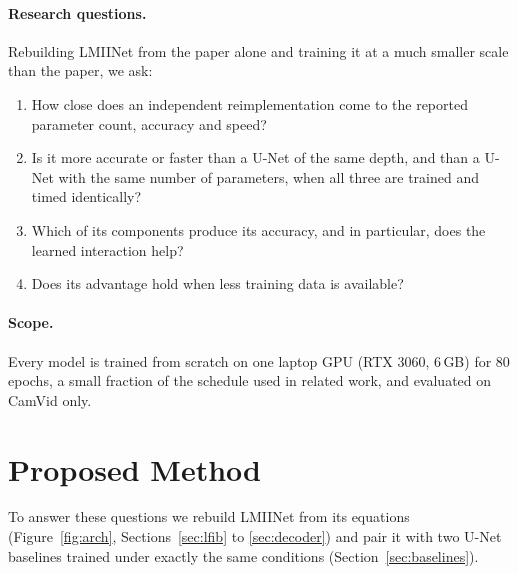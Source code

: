 \documentclass{article}
\begin{document}
\paragraph{Research questions.} Rebuilding LMIINet from the paper alone and training it at a much
smaller scale than the paper, we ask:
\begin{enumerate}
  \item[RQ1] How close does an independent reimplementation come to the reported parameter count,
             accuracy and speed?
  \item[RQ2] Is it more accurate or faster than a U-Net of the same depth, and than a U-Net with the
             same number of parameters, when all three are trained and timed identically?
  \item[RQ3] Which of its components produce its accuracy, and in particular, does the learned
             interaction help?
  \item[RQ4] Does its advantage hold when less training data is available?
\end{enumerate}

\paragraph{Scope.} Every model is trained from scratch on one laptop GPU (RTX 3060, 6\,GB) for 80
epochs, a small fraction of the schedule used in related work, and evaluated on CamVid only.

\section{Proposed Method}
\label{sec:method}

To answer these questions we rebuild LMIINet from its equations (Figure~\ref{fig:arch},
Sections~\ref{sec:lfib} to \ref{sec:decoder}) and pair it with two U-Net baselines trained under
exactly the same conditions (Section~\ref{sec:baselines}).
\end{document}
